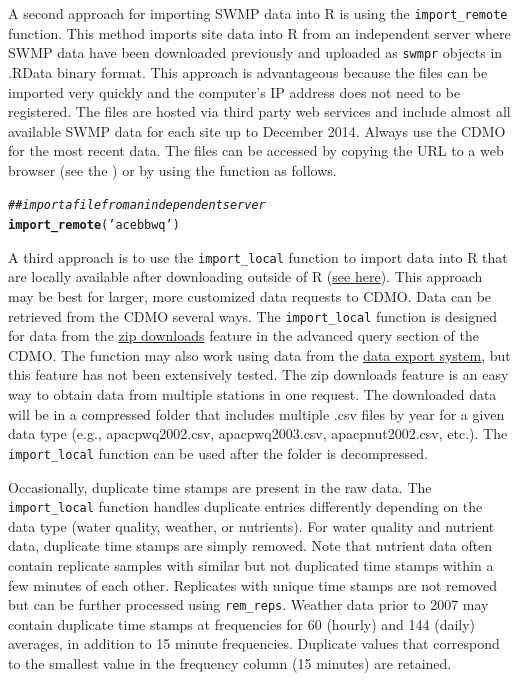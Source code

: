 \documentclass[10pt,letterpaper]{article}\usepackage[]{graphicx}\usepackage[]{color}
\makeatletter
\newcommand{\hlstr}[1]{\textcolor[rgb]{0.192,0.494,0.8}{#1}}%
\newcommand{\hlcom}[1]{\textcolor[rgb]{0.678,0.584,0.686}{\textit{#1}}}%
\newcommand{\hlstd}[1]{\textcolor[rgb]{0.345,0.345,0.345}{#1}}%
\newcommand{\hlkwd}[1]{\textcolor[rgb]{0.737,0.353,0.396}{\textbf{#1}}}%
\newenvironment{kframe}{%
 \def\at@end@of@kframe{}%
 \ifinner\ifhmode%
  \def\at@end@of@kframe{\end{minipage}}%
  \begin{minipage}{\columnwidth}%
 \fi\fi%
 \def\FrameCommand##1{\hskip\@totalleftmargin \hskip-\fboxsep
 \colorbox{shadecolor}{##1}\hskip-\fboxsep
     \hskip-\linewidth \hskip-\@totalleftmargin \hskip\columnwidth}%
 \MakeFramed {\advance\hsize-\width
   \@totalleftmargin\z@ \linewidth\hsize
   \@setminipage}}%
 {\par\unskip\endMakeFramed%
 \at@end@of@kframe}
\newenvironment{knitrout}{}{} %
\makeatother
\begin{document}
A second approach for importing \ac{SWMP} data into R is using the \texttt{import\_remote} function.  This method imports site data into R from an independent server where \ac{SWMP} data have been downloaded previously and uploaded as \texttt{swmpr} objects in .RData binary format.  This approach is advantageous because the files can be imported very quickly and the computer's IP address does not need to be registered.  The files are hosted via third party web services and include almost all available \ac{SWMP} data for each site up to December 2014.  Always use the \ac{CDMO} for the most recent data.  The files can be accessed by copying the URL to a web browser (see the ) or by using the function as follows.

\begin{knitrout}
\color{fgcolor}\begin{kframe}
\begin{alltt}
\hlcom{## import a file from an independent server}
\hlkwd{import_remote}\hlstd{(}\hlstr{'acebbwq'}\hlstd{)}
\end{alltt}
\end{kframe}
\end{knitrout}

A third approach is to use the \texttt{import\_local} function to import data into R that are locally available after downloading outside of R (\href{http://cdmo.baruch.sc.edu/get/landing.cfm}{see here}).  This approach may be best for larger, more customized data requests to \ac{CDMO}. Data can be retrieved from the \ac{CDMO} several ways.  The \texttt{import\_local} function is designed for data from the \href{http://cdmo.baruch.sc.edu/aqs/zips.cfm}{zip downloads} feature in the advanced query section of the \ac{CDMO}. The function may also work using data from the \href{http://cdmo.baruch.sc.edu/get/export.cfm}{data export system}, but this feature has not been extensively tested.  The zip downloads feature is an easy way to obtain data from multiple stations in one request.  The downloaded data will be in a compressed folder that includes multiple .csv files by year for a given data type (e.g., apacpwq2002.csv, apacpwq2003.csv, apacpnut2002.csv, etc.).  The \texttt{import\_local} function can be used after the folder is decompressed.

Occasionally, duplicate time stamps are present in the raw data.  The \texttt{import\_local} function handles duplicate entries differently depending on the data type (water quality,  weather, or nutrients).  For water quality and nutrient data, duplicate time stamps are simply removed.  Note that nutrient data often contain replicate samples with similar but not duplicated time stamps within a few minutes of each other.  Replicates with unique time stamps are not removed but can be further processed using \texttt{rem\_reps}.  Weather data prior to 2007 may contain duplicate time stamps at frequencies for 60 (hourly) and 144 (daily) averages, in addition to 15 minute frequencies.  Duplicate values that correspond to the smallest value in the frequency column (15 minutes) are retained.  
\end{document}
